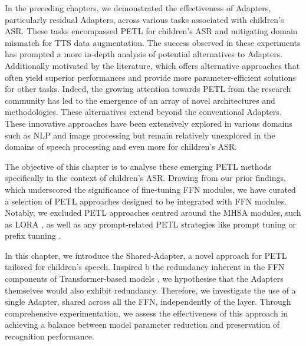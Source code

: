 \label{chap:7}
\cleardoublepage
In the preceding chapters, we demonstrated the effectiveness of Adapters, particularly residual Adapters, across various tasks associated with children's \ac{ASR}. These tasks encompassed \ac{PETL} for children's \ac{ASR} and mitigating domain mismatch for \ac{TTS} data augmentation. The success observed in these experiments has prompted a more in-depth analysis of potential alternatives to Adapters. Additionally motivated by the literature, which offers alternative approaches that often yield superior performances and provide more parameter-efficient solutions for other tasks.
Indeed, the growing attention towards \ac{PETL} from the research community has led to the emergence of an array of novel architectures and methodologies. These alternatives extend beyond the conventional Adapters. These innovative approaches have been extensively explored in various domains such as \ac{NLP} and image processing but remain relatively unexplored in the domains of speech processing \cite{chen2023exploring} and even more for children's \ac{ASR}.

The objective of this chapter is to analyse these emerging \ac{PETL} methods specifically in the context of children's \ac{ASR}. Drawing from our prior findings, which underscored the significance of fine-tuning \ac{FFN} modules, we have curated a selection of \ac{PETL} approaches designed to be integrated with \ac{FFN} modules. Notably, we excluded \ac{PETL} approaches centred around the \ac{MHSA} modules, such as LORA \cite{hu2022lora}, as well as any prompt-related \ac{PETL} strategies like prompt tuning \cite{lester-etal-2021-power} or prefix tunning \cite{li-liang-2021-prefix}.

In this chapter, we introduce the Shared-Adapter, a novel approach for \ac{PETL} tailored for children's speech. Inspired b the redundancy inherent in the \ac{FFN} components of Transformer-based models \cite{pires2023one}, we hypothesise that the Adapters themselves would also exhibit redundancy. Therefore, we investigate the use of a single Adapter, shared across all the \ac{FFN}, independently of the layer. Through comprehensive experimentation, we assess the effectiveness of this approach in achieving a balance between model parameter reduction and preservation of recognition performance.

